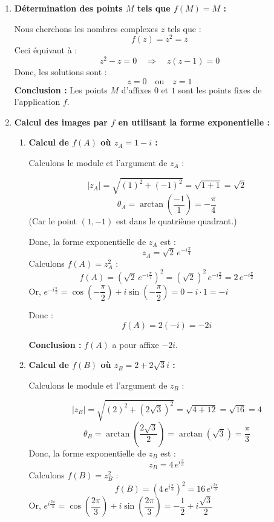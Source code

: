 \documentclass[a4paper,12pt]{article}
\begin{document}
\begin{solutionbox}
\begin{enumerate}
    \item \textbf{Détermination des points \( M \) tels que \( f(M) = M \) :}
    
    Nous cherchons les nombres complexes \( z \) tels que :
    \[
    f(z) = z^2 = z
    \]
    Ceci équivaut à :
    \[
    z^2 - z = 0 \quad \Rightarrow \quad z(z - 1) = 0
    \]
    Donc, les solutions sont :
    \[
    z = 0 \quad \text{ou} \quad z = 1
    \]
    \textbf{Conclusion :} Les points \( M \) d'affixes \( 0 \) et \( 1 \) sont les points fixes de l'application \( f \).

    \item \textbf{Calcul des images par \( f \) en utilisant la forme exponentielle :}

    \begin{enumerate}
        \item \textbf{Calcul de \( f(A) \) où \( z_A = 1 - i \) :}

        Calculons le module et l'argument de \( z_A \) :

        \[
        |z_A| = \sqrt{(1)^2 + (-1)^2} = \sqrt{1 + 1} = \sqrt{2}
        \]
        \[
        \theta_A = \arctan\left( \dfrac{-1}{1} \right) = -\dfrac{\pi}{4}
        \]
        (Car le point \( (1, -1) \) est dans le quatrième quadrant.)

        Donc, la forme exponentielle de \( z_A \) est :
        \[
        z_A = \sqrt{2} \, e^{-i \frac{\pi}{4}}
        \]
        Calculons \( f(A) = z_A^2 \) :
        \[
        f(A) = \left( \sqrt{2} \, e^{-i \frac{\pi}{4}} \right)^2 = (\sqrt{2})^2 \, e^{-i \frac{\pi}{2}} = 2 \, e^{-i \frac{\pi}{2}}
        \]
        Or, \( e^{-i \frac{\pi}{2}} = \cos\left( -\dfrac{\pi}{2} \right) + i \sin\left( -\dfrac{\pi}{2} \right) = 0 - i \cdot 1 = -i \)

        Donc :
        \[
        f(A) = 2 (-i) = -2i
        \]

        \textbf{Conclusion :} \( f(A) \) a pour affixe \( -2i \).

        \item \textbf{Calcul de \( f(B) \) où \( z_B = 2 + 2\sqrt{3}i \) :}

        Calculons le module et l'argument de \( z_B \) :

        \[
        |z_B| = \sqrt{(2)^2 + (2\sqrt{3})^2} = \sqrt{4 + 12} = \sqrt{16} = 4
        \]
        \[
        \theta_B = \arctan\left( \dfrac{2\sqrt{3}}{2} \right) = \arctan(\sqrt{3}) = \dfrac{\pi}{3}
        \]
        Donc, la forme exponentielle de \( z_B \) est :
        \[
        z_B = 4 \, e^{i \frac{\pi}{3}}
        \]
        Calculons \( f(B) = z_B^2 \) :
        \[
        f(B) = \left( 4 \, e^{i \frac{\pi}{3}} \right)^2 = 16 \, e^{i \frac{2\pi}{3}}
        \]
        Or, \( e^{i \frac{2\pi}{3}} = \cos\left( \dfrac{2\pi}{3} \right) + i \sin\left( \dfrac{2\pi}{3} \right) = -\dfrac{1}{2} + i \dfrac{\sqrt{3}}{2} \)


\end{enumerate}
\end{enumerate}
\end{solutionbox}
\end{document}
